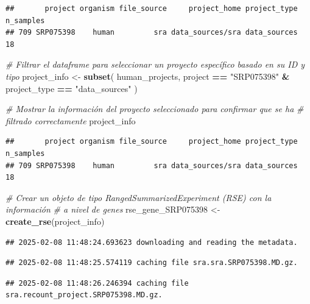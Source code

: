 \documentclass[
]{article}
\newenvironment{Shaded}{\begin{snugshade}}{\end{snugshade}}
\newcommand{\CommentTok}[1]{\textcolor[rgb]{0.56,0.35,0.01}{\textit{#1}}}
\newcommand{\FunctionTok}[1]{\textcolor[rgb]{0.13,0.29,0.53}{\textbf{#1}}}
\newcommand{\NormalTok}[1]{#1}
\newcommand{\OtherTok}[1]{\textcolor[rgb]{0.56,0.35,0.01}{#1}}
\newcommand{\SpecialCharTok}[1]{\textcolor[rgb]{0.81,0.36,0.00}{\textbf{#1}}}
\newcommand{\StringTok}[1]{\textcolor[rgb]{0.31,0.60,0.02}{#1}}
\begin{document}
\begin{verbatim}
##       project organism file_source     project_home project_type n_samples
## 709 SRP075398    human         sra data_sources/sra data_sources        18
\end{verbatim}

\begin{Shaded}
\begin{Highlighting}[]
\CommentTok{\# Filtrar el dataframe para seleccionar un proyecto específico basado en su ID y tipo}
\NormalTok{project\_info }\OtherTok{\textless{}{-}} \FunctionTok{subset}\NormalTok{(}
\NormalTok{  human\_projects,}
\NormalTok{  project }\SpecialCharTok{==} \StringTok{"SRP075398"} \SpecialCharTok{\&}\NormalTok{ project\_type }\SpecialCharTok{==} \StringTok{"data\_sources"}
\NormalTok{)}

\CommentTok{\# Mostrar la información del proyecto seleccionado para confirmar que se ha}
\CommentTok{\# filtrado correctamente}
\NormalTok{project\_info}
\end{Highlighting}
\end{Shaded}

\begin{verbatim}
##       project organism file_source     project_home project_type n_samples
## 709 SRP075398    human         sra data_sources/sra data_sources        18
\end{verbatim}

\begin{Shaded}
\begin{Highlighting}[]
\CommentTok{\# Crear un objeto de tipo RangedSummarizedExperiment (RSE) con la información}
\CommentTok{\# a nivel de genes}
\NormalTok{rse\_gene\_SRP075398 }\OtherTok{\textless{}{-}} \FunctionTok{create\_rse}\NormalTok{(project\_info)}
\end{Highlighting}
\end{Shaded}

\begin{verbatim}
## 2025-02-08 11:48:24.693623 downloading and reading the metadata.
\end{verbatim}

\begin{verbatim}
## 2025-02-08 11:48:25.574119 caching file sra.sra.SRP075398.MD.gz.
\end{verbatim}

\begin{verbatim}
## 2025-02-08 11:48:26.246394 caching file sra.recount_project.SRP075398.MD.gz.
\end{verbatim}
\end{document}
